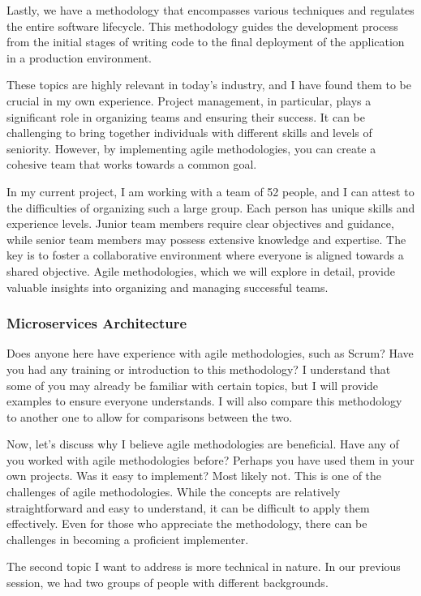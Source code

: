 Lastly, we have a methodology that encompasses various techniques and
regulates the entire software lifecycle. This methodology guides the
development process from the initial stages of writing code to the final
deployment of the application in a production environment.

These topics are highly relevant in today's industry, and I have found
them to be crucial in my own experience. Project management, in
particular, plays a significant role in organizing teams and ensuring
their success. It can be challenging to bring together individuals with
different skills and levels of seniority. However, by implementing agile
methodologies, you can create a cohesive team that works towards a
common goal.

In my current project, I am working with a team of 52 people, and I can
attest to the difficulties of organizing such a large group. Each person
has unique skills and experience levels. Junior team members require
clear objectives and guidance, while senior team members may possess
extensive knowledge and expertise. The key is to foster a collaborative
environment where everyone is aligned towards a shared objective. Agile
methodologies, which we will explore in detail, provide valuable
insights into organizing and managing successful teams.

\subsubsection{Microservices Architecture}

Does anyone here have experience with agile methodologies, such as
Scrum? Have you had any training or introduction to this methodology? I
understand that some of you may already be familiar with certain topics,
but I will provide examples to ensure everyone understands. I will also
compare this methodology to another one to allow for comparisons between
the two.

Now, let's discuss why I believe agile methodologies are beneficial.
Have any of you worked with agile methodologies before? Perhaps you have
used them in your own projects. Was it easy to implement? Most likely
not. This is one of the challenges of agile methodologies. While the
concepts are relatively straightforward and easy to understand, it can
be difficult to apply them effectively. Even for those who appreciate
the methodology, there can be challenges in becoming a proficient
implementer.

The second topic I want to address is more technical in nature. In our
previous session, we had two groups of people with different
backgrounds.

